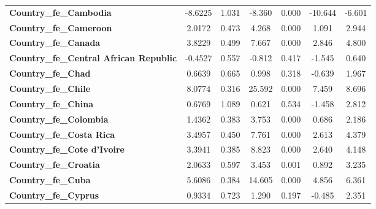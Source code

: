 \begin{center}
\begin{tabular}{lcccccc}
\textbf{Country\_fe\_Cambodia}                       &      -8.6225  &        1.031     &    -8.360  &         0.000        &      -10.644    &       -6.601     \\
\textbf{Country\_fe\_Cameroon}                       &       2.0172  &        0.473     &     4.268  &         0.000        &        1.091    &        2.944     \\
\textbf{Country\_fe\_Canada}                         &       3.8229  &        0.499     &     7.667  &         0.000        &        2.846    &        4.800     \\
\textbf{Country\_fe\_Central African Republic}       &      -0.4527  &        0.557     &    -0.812  &         0.417        &       -1.545    &        0.640     \\
\textbf{Country\_fe\_Chad}                           &       0.6639  &        0.665     &     0.998  &         0.318        &       -0.639    &        1.967     \\
\textbf{Country\_fe\_Chile}                          &       8.0774  &        0.316     &    25.592  &         0.000        &        7.459    &        8.696     \\
\textbf{Country\_fe\_China}                          &       0.6769  &        1.089     &     0.621  &         0.534        &       -1.458    &        2.812     \\
\textbf{Country\_fe\_Colombia}                       &       1.4362  &        0.383     &     3.753  &         0.000        &        0.686    &        2.186     \\
\textbf{Country\_fe\_Costa Rica}                     &       3.4957  &        0.450     &     7.761  &         0.000        &        2.613    &        4.379     \\
\textbf{Country\_fe\_Cote d'Ivoire}                  &       3.3941  &        0.385     &     8.823  &         0.000        &        2.640    &        4.148     \\
\textbf{Country\_fe\_Croatia}                        &       2.0633  &        0.597     &     3.453  &         0.001        &        0.892    &        3.235     \\
\textbf{Country\_fe\_Cuba}                           &       5.6086  &        0.384     &    14.605  &         0.000        &        4.856    &        6.361     \\
\textbf{Country\_fe\_Cyprus}                         &       0.9334  &        0.723     &     1.290  &         0.197        &       -0.485    &        2.351     \\

\end{tabular}
\end{center}
